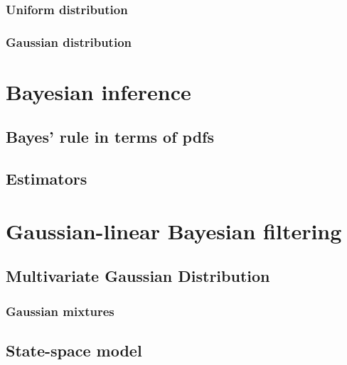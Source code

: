 \documentclass[english,master,unicode]{ctufit-thesis}
\theoremstyle{plain}
\theoremstyle{definition}
\theoremstyle{remark}
\numberwithin{theorem}{chapter}
\begin{document}
            \subsubsection{Uniform distribution}\label{sec:uniform-distribution}
                
            \subsubsection{Gaussian distribution}\label{sec:gaussian-distribution}
                
    \section{Bayesian inference}\label{sec:bayesian-inference}
        
        \subsection{Bayes' rule in terms of pdfs}\label{sec:bayes-rule-pdf}
            
        \subsection{Estimators}\label{sec:estimators}
            
    \section{Gaussian-linear Bayesian filtering}\label{sec:gauss-linear-filtering}
        
        \subsection{Multivariate Gaussian Distribution}\label{sec:multivariate-gaussian}
            
            \subsubsection{Gaussian mixtures}\label{sec:gaussian-mixtures}
                
        \subsection{State-space model}\label{sec:state-space}
            
\end{document}

